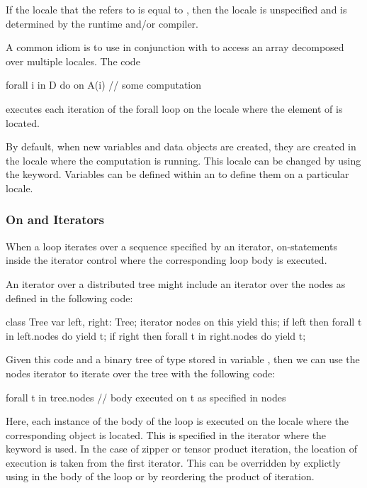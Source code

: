 If the locale that the  refers to is equal
to , then the locale is unspecified and is determined by
the runtime and/or compiler.

\begin{example}
A common idiom is to use  in conjunction with 
to access an array decomposed over multiple locales.  The code
\begin{chapel}
forall i in D do on A(i) {
  // some computation
}
\end{chapel}
executes each iteration of the forall loop on the locale where the
element of  is located.
\end{example}

By default, when new variables and data objects are created, they are
created in the locale where the computation is running.  This locale
can be changed by using the  keyword.  Variables can be
defined within an  to define them on a particular
locale.

\subsubsection{On and Iterators}
\label{On_and_Iterators}

When a loop iterates over a sequence specified by an iterator,
on-statements inside the iterator control where the corresponding loop
body is executed.

\begin{example}
An iterator over a distributed tree might include an iterator over the
nodes as defined in the following code:
\begin{chapel}
class Tree {
  var left, right: Tree;
  iterator nodes {
    on this yield this;
    if left then
      forall t in left.nodes do
        yield t;
    if right then
      forall t in right.nodes do
        yield t;
  }
}
\end{chapel}
Given this code and a binary tree of type  stored in
variable , then we can use the nodes iterator to iterate
over the tree with the following code:
\begin{chapel}
forall t in tree.nodes {
  // body executed on t as specified in nodes
}
\end{chapel}
Here, each instance of the body of the  loop is executed
on the locale where the corresponding object  is located.
This is specified in the  iterator where the 
keyword is used.  In the case of zipper or tensor product iteration,
the location of execution is taken from the first iterator.  This can
be overridden by explictly using  in the body of the loop or
by reordering the product of iteration.
\end{example}


